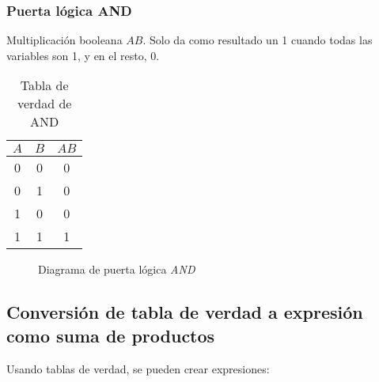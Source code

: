 \documentclass[12pt]{article}
\begin{document}
		\subsubsection{\textbf{Puerta lógica AND}}

		Multiplicación booleana $AB$. Solo da como resultado un 1 cuando todas las variables son 1, y en el resto, 0.

		\begin{multicols}{2}
			\begin{table}[H]
				\centering
				\begin{tabular}{|c c|c}
					$A$ & $B$ & $AB$ \\
					\hline
					0 & 0 & 0 \\
					0 & 1 & 0 \\
					1 & 0 & 0 \\
					1 & 1 & 1
				\end{tabular}
				\caption{Tabla de verdad de AND}
				\label{tab:my_label}
			\end{table}


			\columnbreak
			\newpage
			\begin{figure}[H]
				\centering
				
				\caption{Diagrama de puerta lógica \textit{AND} \cite{logic_gate}}
				\label{fig:and}
			\end{figure}
		\end{multicols}

		\newpage
		\subsection{Conversión de tabla de verdad a expresión como suma de productos \cite{floyd_fundamentos_2006}}
		Usando tablas de verdad, se pueden crear expresiones:
\end{document}
